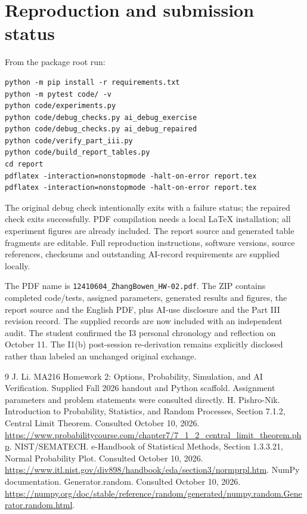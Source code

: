 \documentclass[11pt,a4paper]{article}
\begin{document}
\bigskip


\section{Reproduction and submission status}
From the package root run:
\begin{verbatim}
python -m pip install -r requirements.txt
python -m pytest code/ -v
python code/experiments.py
python code/debug_checks.py ai_debug_exercise
python code/debug_checks.py ai_debug_repaired
python code/verify_part_iii.py
python code/build_report_tables.py
cd report
pdflatex -interaction=nonstopmode -halt-on-error report.tex
pdflatex -interaction=nonstopmode -halt-on-error report.tex
\end{verbatim}
The original debug check intentionally exits with a failure status; the repaired check exits successfully. PDF compilation needs a local LaTeX installation; all experiment figures are already included. The report source and generated table fragments are editable. Full reproduction instructions, software versions, source references, checksums and outstanding AI-record requirements are supplied locally.

The PDF name is \texttt{12410604\_ZhangBowen\_HW-02.pdf}. The ZIP contains completed code/tests, assigned parameters, generated results and figures, the report source and the English PDF, plus AI-use disclosure and the Part III revision record. The supplied records are now included with an independent audit. The student confirmed the I3 personal chronology and reflection on October 11. The I1(b) post-session re-derivation remains explicitly disclosed rather than labeled an unchanged original exchange.

\begin{thebibliography}{9}
 J. Li. MA216 Homework 2: Options, Probability, Simulation, and AI Verification. Supplied Fall 2026 handout and Python scaffold. Assignment parameters and problem statements were consulted directly.
 H. Pishro-Nik. Introduction to Probability, Statistics, and Random Processes, Section 7.1.2, Central Limit Theorem. Consulted October 10, 2026. \url{https://www.probabilitycourse.com/chapter7/7_1_2_central_limit_theorem.php}.
 NIST/SEMATECH. e-Handbook of Statistical Methods, Section 1.3.3.21, Normal Probability Plot. Consulted October 10, 2026. \url{https://www.itl.nist.gov/div898/handbook/eda/section3/normprpl.htm}.
 NumPy documentation. Generator.random. Consulted October 10, 2026. \url{https://numpy.org/doc/stable/reference/random/generated/numpy.random.Generator.random.html}.
\end{thebibliography}
\end{document}
